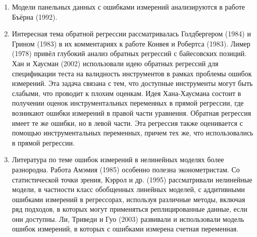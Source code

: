 \begin{enumerate}
\item Модели панельных данных с ошибками измерений анализируются в работе Бъёрна (1992).
\item Интересная тема обратной регрессии рассматривалась Голдбергером (1984) и Грином (1983) в их комментариях к работе Конвея и Робертса (1983). Лимер (1978) привёл глубокий анализ обратных регрессий с байесовских позиций. Хан и Хаусман (2002) использовали идею обратных регрессий для спецификации теста на валидность инструментов в рамках проблемы ошибок измерений. Эта задача связана с тем, что доступные инструменты могут быть слабыми, что проводит к плохим оценкам. Идея Хана-Хаусмана состоит в получении оценок инструментальных переменных в прямой регрессии, где возникают ошибки измерений в правой части уравнения. Обратная регрессия имеет те же ошибки, но в левой части. Эта регрессия также оценивается с помощью инструментальных переменных, причем тех же, что использовались в прямой регрессии.
\item Литература по теме ошибок измерений в нелинейных моделях более разнородна. Работа Амэмия (1985) особенно полезна эконометристам. Со статистической точки зрения, Кэррол и др. (1995) рассматривали нелинейные модели, в частности класс обобщенных линейных моделей, с аддитивными ошибками измерений в регрессорах, используя различные методы, включая ряд подходов, в которых могут применяться реплицированные данные, если они доступны. Ли, Триведи и Гуо (2003) развивали и использовали модель ошибок измерений, в которых с ошибками измерена счетная переменная.
\end{enumerate}


